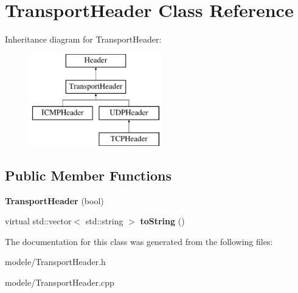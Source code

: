 \hypertarget{class_transport_header}{\section{Transport\-Header Class Reference}
\label{class_transport_header}
}
Inheritance diagram for Transport\-Header\-:\begin{figure}[H]
\begin{center}
\leavevmode
\includegraphics[height=4.000000cm]{class_transport_header}
\end{center}
\end{figure}
\subsection*{Public Member Functions}
\begin{DoxyCompactItemize}
\item 
\hypertarget{class_transport_header_a40a30c62831b7dacc28cfc91a6f28123}{{\bfseries Transport\-Header} (bool)}\label{class_transport_header_a40a30c62831b7dacc28cfc91a6f28123}

\item 
\hypertarget{class_transport_header_acd1f7d3b44c1caafb30765aecb690f9e}{virtual std\-::vector$<$ std\-::string $>$ {\bfseries to\-String} ()}\label{class_transport_header_acd1f7d3b44c1caafb30765aecb690f9e}

\end{DoxyCompactItemize}


The documentation for this class was generated from the following files\-:\begin{DoxyCompactItemize}
\item 
modele/Transport\-Header.\-h\item 
modele/Transport\-Header.\-cpp\end{DoxyCompactItemize}
